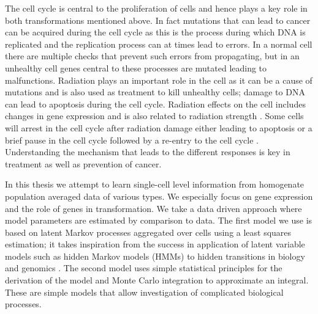 The cell cycle is central to the proliferation of cells and hence plays a key role in both transformations mentioned above. In fact mutations that can lead to cancer can be acquired during the cell cycle as this is the process during which DNA is replicated and the replication process can at times lead to errors. In a normal cell there are multiple checks that prevent such errors from propagating, but in an unhealthy cell genes central to these processes are mutated leading to malfunctions. Radiation plays an important role in the cell as it can be a cause of mutations and is also used as treatment to kill unhealthy cells; damage to DNA can lead to apoptosis during the cell cycle. Radiation effects on the cell includes changes in gene expression and is also related to radiation strength \citep{Gentile:2003in}. Some cells will arrest in the cell cycle after radiation damage either leading to apoptosis or a brief pause in the cell cycle followed by a re-entry to the cell cycle \citep{Pawlik2004928}. Understanding the mechanism that leads to the different responses is key in treatment as well as prevention of cancer.

In this thesis we attempt to learn single-cell level information from homogenate population averaged data of various types. We especially focus on gene expression and the role of genes in transformation. We take a data driven approach where model parameters are estimated by comparison to data. The first model we use is based on latent Markov processes aggregated over cells using a least squares estimation; it takes inspiration from the success in application of latent variable models such as hidden Markov models (HMMs) to hidden transitions in biology and genomics \citep{Yoon:2009dl,Ernst:2012iia}. The second model uses simple statistical principles for the derivation of the model and Monte Carlo integration to approximate an integral. These are simple models that allow investigation of complicated biological processes.

